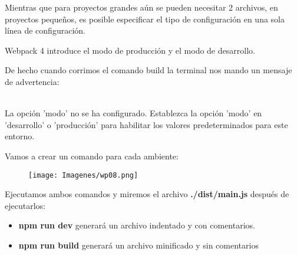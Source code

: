 \item Mientras que para proyectos grandes aún se pueden necesitar 2 archivos, en proyectos pequeños, es posible especificar el tipo de configuración en una sola línea de configuración.

\item Webpack 4 introduce el modo de producción y el modo de desarrollo.

\item De hecho cuando corrimos el comando build la terminal nos mando un mensaje de advertencia:\\

\\

\item La opción 'modo' no se ha configurado. Establezca la opción 'modo' en 'desarrollo' o 'producción' para habilitar los valores predeterminados para este entorno.

\item Vamos a crear un comando para cada ambiente:
\begin{figure}[h]
    \centering
    \texttt{[image: Imagenes/wp08.png]}
    \label{fig:my_label}
\end{figure}

\item Ejecutamos ambos comandos y miremos el archivo \textbf{./dist/main.js} después de ejecutarlos:
\begin{itemize}
    \item \textbf{npm run dev} generará un archivo indentado y con comentarios.
    \item \textbf{npm run build} generará un archivo minificado y sin comentarios
\end{itemize}

